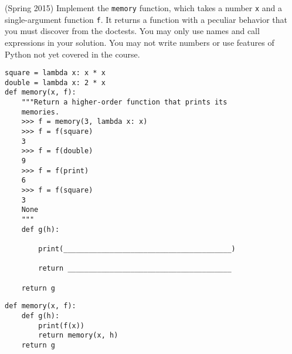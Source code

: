 \question (Spring 2015) Implement the {\tt memory} function, which takes a
number {\tt x} and a single-argument function {\tt f}. It returns a function
with a peculiar behavior that you must discover from the doctests. You may only
use names and call expressions in your solution. You may not write numbers or
use features of Python not yet covered in the course.
\begin{lstlisting}
square = lambda x: x * x
double = lambda x: 2 * x
def memory(x, f):
    """Return a higher-order function that prints its
    memories.
    >>> f = memory(3, lambda x: x)
    >>> f = f(square)
    3
    >>> f = f(double)
    9
    >>> f = f(print)
    6
    >>> f = f(square)
    3
    None
    """
    def g(h):

        print(________________________________________)

        return _______________________________________

    return g
\end{lstlisting}
\begin{solution}
\begin{lstlisting}
def memory(x, f):
    def g(h):
        print(f(x))
        return memory(x, h)
    return g
\end{lstlisting}
\end{solution}
